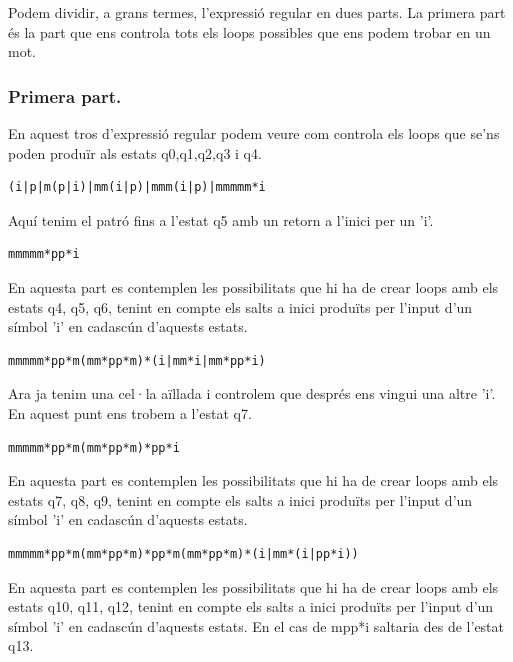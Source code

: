 \documentclass[12pt,a4paper]{report}
\begin{document}
Podem dividir, a grans termes, l'expressió regular en dues parts.
La primera part és la part que ens controla tots els loops possibles que ens podem trobar en un mot.

\subsubsection{Primera part.}

En aquest tros d'expressió regular podem veure com controla els loops que se'ns poden produïr als estats q0,q1,q2,q3 i q4.

\begin{lstlisting}
(i|p|m(p|i)|mm(i|p)|mmm(i|p)|mmmmm*i
\end{lstlisting}

Aquí tenim el patró fins a l'estat q5 amb un retorn a l'inici per un 'i'.

\begin{lstlisting}
mmmmm*pp*i
\end{lstlisting}

En aquesta part es contemplen les possibilitats que  hi ha de crear loops amb els estats q4, q5, q6, tenint en compte els salts a inici produïts per l'input d'un símbol 'i' en cadascún d'aquests estats.

\begin{lstlisting}
mmmmm*pp*m(mm*pp*m)*(i|mm*i|mm*pp*i)
\end{lstlisting}

Ara ja tenim una cel·la aïllada i controlem que després ens vingui una altre 'i'. En aquest punt ens trobem a l'estat q7.

\begin{lstlisting}
mmmmm*pp*m(mm*pp*m)*pp*i
\end{lstlisting}

En aquesta part es contemplen les possibilitats que  hi ha de crear loops amb els estats q7, q8, q9, tenint en compte els salts a inici produïts per l'input d'un símbol 'i' en cadascún d'aquests estats.

\begin{lstlisting}
mmmmm*pp*m(mm*pp*m)*pp*m(mm*pp*m)*(i|mm*(i|pp*i))
\end{lstlisting}

En aquesta part es contemplen les possibilitats que  hi ha de crear loops amb els estats q10, q11, q12,  tenint en compte els salts a inici produïts per l'input d'un símbol 'i' en cadascún d'aquests estats. En el cas de mpp*i saltaria des de l'estat q13.
\end{document}
